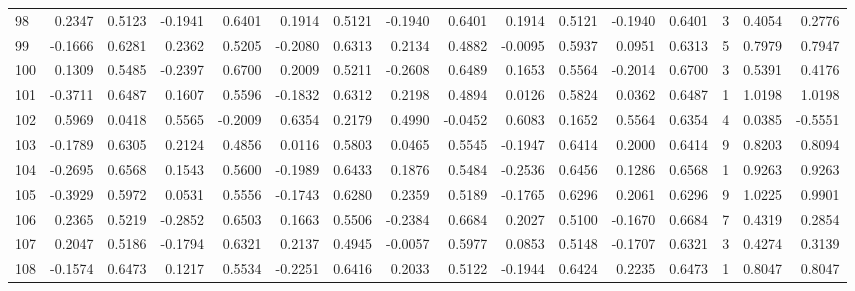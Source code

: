 \begin{tabular}{lrrrrrrrrrrrrrrr}
98  &      0.2347 &  0.5123 & -0.1941 &  0.6401 &  0.1914 &  0.5121 & -0.1940 &  0.6401 &  0.1914 &  0.5121 &  -0.1940 &     0.6401 &      3 &                    0.4054 &                     0.2776 \\
99  &     -0.1666 &  0.6281 &  0.2362 &  0.5205 & -0.2080 &  0.6313 &  0.2134 &  0.4882 & -0.0095 &  0.5937 &   0.0951 &     0.6313 &      5 &                    0.7979 &                     0.7947 \\
100 &      0.1309 &  0.5485 & -0.2397 &  0.6700 &  0.2009 &  0.5211 & -0.2608 &  0.6489 &  0.1653 &  0.5564 &  -0.2014 &     0.6700 &      3 &                    0.5391 &                     0.4176 \\
101 &     -0.3711 &  0.6487 &  0.1607 &  0.5596 & -0.1832 &  0.6312 &  0.2198 &  0.4894 &  0.0126 &  0.5824 &   0.0362 &     0.6487 &      1 &                    1.0198 &                     1.0198 \\
102 &      0.5969 &  0.0418 &  0.5565 & -0.2009 &  0.6354 &  0.2179 &  0.4990 & -0.0452 &  0.6083 &  0.1652 &   0.5564 &     0.6354 &      4 &                    0.0385 &                    -0.5551 \\
103 &     -0.1789 &  0.6305 &  0.2124 &  0.4856 &  0.0116 &  0.5803 &  0.0465 &  0.5545 & -0.1947 &  0.6414 &   0.2000 &     0.6414 &      9 &                    0.8203 &                     0.8094 \\
104 &     -0.2695 &  0.6568 &  0.1543 &  0.5600 & -0.1989 &  0.6433 &  0.1876 &  0.5484 & -0.2536 &  0.6456 &   0.1286 &     0.6568 &      1 &                    0.9263 &                     0.9263 \\
105 &     -0.3929 &  0.5972 &  0.0531 &  0.5556 & -0.1743 &  0.6280 &  0.2359 &  0.5189 & -0.1765 &  0.6296 &   0.2061 &     0.6296 &      9 &                    1.0225 &                     0.9901 \\
106 &      0.2365 &  0.5219 & -0.2852 &  0.6503 &  0.1663 &  0.5506 & -0.2384 &  0.6684 &  0.2027 &  0.5100 &  -0.1670 &     0.6684 &      7 &                    0.4319 &                     0.2854 \\
107 &      0.2047 &  0.5186 & -0.1794 &  0.6321 &  0.2137 &  0.4945 & -0.0057 &  0.5977 &  0.0853 &  0.5148 &  -0.1707 &     0.6321 &      3 &                    0.4274 &                     0.3139 \\
108 &     -0.1574 &  0.6473 &  0.1217 &  0.5534 & -0.2251 &  0.6416 &  0.2033 &  0.5122 & -0.1944 &  0.6424 &   0.2235 &     0.6473 &      1 &                    0.8047 &                     0.8047 \\

\end{tabular}
